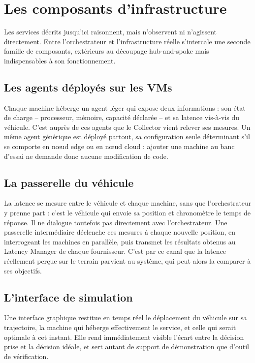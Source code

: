 \section{Les composants d'infrastructure}
\label{sec:infra-composants}

Les services décrits jusqu'ici raisonnent, mais n'observent ni n'agissent directement. Entre l'orchestrateur et l'infrastructure réelle s'intercale une seconde famille de composants, extérieurs au découpage hub-and-spoke mais indispensables à son fonctionnement.

\subsection{Les agents déployés sur les VMs}
Chaque machine héberge un agent léger qui expose deux informations : son état de charge -- processeur, mémoire, capacité déclarée -- et sa latence vis-à-vis du véhicule. C'est auprès de ces agents que le Collector vient relever ses mesures. Un même agent générique est déployé partout, sa configuration seule déterminant s'il se comporte en nœud edge ou en nœud cloud : ajouter une machine au banc d'essai ne demande donc aucune modification de code.

\subsection{La passerelle du véhicule}
La latence se mesure entre le véhicule et chaque machine, sans que l'orchestrateur y prenne part : c'est le véhicule qui envoie sa position et chronomètre le temps de réponse. Il ne dialogue toutefois pas directement avec l'orchestrateur. Une passerelle intermédiaire déclenche ces mesures à chaque nouvelle position, en interrogeant les machines en parallèle, puis transmet les résultats obtenus au Latency Manager de chaque fournisseur. C'est par ce canal que la latence réellement perçue sur le terrain parvient au système, qui peut alors la comparer à ses objectifs.

\subsection{L'interface de simulation}
Une interface graphique restitue en temps réel le déplacement du véhicule sur sa trajectoire, la machine qui héberge effectivement le service, et celle qui serait optimale à cet instant. Elle rend immédiatement visible l'écart entre la décision prise et la décision idéale, et sert autant de support de démonstration que d'outil de vérification.

